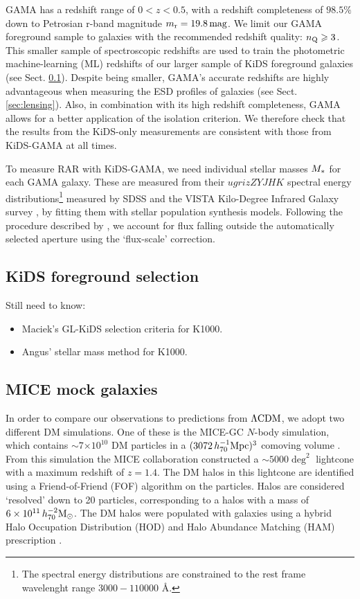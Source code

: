\documentclass[fleqn,usenatbib]{mnras}
\newcommand{\magn}{\, {\rm mag} }
\newcommand{\hsmsun}{\,h_{70}^{-2} {\rm M_\odot}}
\newcommand{\hsMpc}{\, h_{70}^{-1}{\rm{Mpc}} }
\newcommand{\lcdm}{{\rm \Lambda CDM}}
\newcommand*{\E}[1]{\times 10^{#1}}
\newcommand{\un}[1]{_{\rm #1}}
\begin{document}
GAMA has a redshift range of $0<z<0.5$, with a redshift completeness of $98.5\%$ down to Petrosian r-band magnitude $m\un{r} = 19.8 \magn$. We limit our GAMA foreground sample to galaxies with the recommended redshift quality: $n\un{Q}\geq3$. This smaller sample of spectroscopic redshifts are used to train the photometric machine-learning (ML) redshifts of our larger sample of KiDS foreground galaxies (see Sect. \ref{sec:gamalike_kids}). Despite being smaller, GAMA's accurate redshifts are highly advantageous when measuring the ESD profiles of galaxies (see Sect. \ref{sec:lensing}). Also, in combination with its high redshift completeness, GAMA allows for a better application of the isolation criterion. We therefore check that the results from the KiDS-only measurements are consistent with those from KiDS-GAMA at all times.

To measure RAR with KiDS-GAMA, we need individual stellar masses $M\un{*}$ for each GAMA galaxy. These are measured from their $ugrizZYJHK$ spectral energy distributions\footnote{The spectral energy distributions are constrained to the rest frame wavelenght range $3000-110000$ \AA.} measured by SDSS and the VISTA Kilo-Degree Infrared Galaxy survey \cite[VIKING,][]{edge2013}, by fitting them with \cite{bruzual2003} stellar population synthesis models. Following the procedure described by \cite{taylor2011}, we account for flux falling outside the automatically selected aperture using the `flux-scale' correction.

\subsection{KiDS foreground selection}
\label{sec:gamalike_kids}
Still need to know:
\begin{itemize}
	\item Maciek's GL-KiDS selection criteria for K1000.
	\item Angus' stellar mass method for K1000.
\end{itemize}

\subsection{MICE mock galaxies}
\label{sec:mice_mocks}

In order to compare our observations to predictions from $\lcdm$, we adopt two different DM simulations. One of these is the MICE-GC $N$-body simulation, which contains $\sim 7$$\E{10}$ DM particles in a $(3072 \hsMpc)^3$ comoving volume \cite[]{fosalba2015b}. From this simulation the MICE collaboration constructed a $\sim5000\deg^2$ lightcone with a maximum redshift of $z=1.4$. The DM halos in this lightcone are identified using a Friend-of-Friend (FOF) algorithm on the particles. Halos are considered `resolved' down to 20 particles, corresponding to a halos with a mass of $6\E{11} \hsmsun$. The DM halos were populated with galaxies using a hybrid Halo Occupation Distribution (HOD) and Halo Abundance Matching (HAM) prescription \cite[]{carretero2015,crocce2015}.
\end{document}
